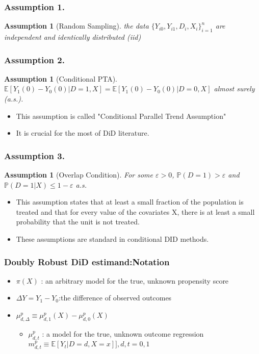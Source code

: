 \documentclass[fleqn]{beamer}
\newtheorem{assumption}[thm]{Assumption}
\begin{document}
\begin{frame}\frametitle{Assumption 1.}
    \begin{assumption}[Random Sampling]
        the data $\{Y_{i0}, Y_{i1}, D_{i}, X_{i}\}^{n}_{i = 1}$ are independent and identically distributed (iid)
    \end{assumption}
\end{frame}

\begin{frame}\frametitle{Assumption 2.}
    \begin{assumption}[Conditional PTA]
        $\mathbb{E}[Y_{1}(0) - Y_{0}(0)| D = 1, X] = \mathbb{E}[Y_{1}(0) - Y_{0}(0)|D = 0, X]$ almost surely (a.s.).
    \end{assumption}
    \begin{itemize}
        \item This assumption is called "Conditional Parallel Trend Assumption"
        \item It is crucial for the most of DiD literature.
    \end{itemize}
\end{frame}

\begin{frame}\frametitle{Assumption 3.}
    \begin{assumption}[Overlap Condition]
        For some $\varepsilon > 0$, $\mathbb{P}(D = 1) > \varepsilon$ and $\mathbb{P}(D = 1|X) \leq 1 - \varepsilon$ a.s.
    \end{assumption}
    \begin{itemize}
        \item This assumption states that at least a small fraction of the population is treated and that for every value of the covariates X, there is at least a small probability that the unit is not treated.%
        \item These assumptions are standard in conditional DID methods.
    \end{itemize}
\end{frame}

\begin{frame}\frametitle{Doubly Robust DiD estimand:Notation}
    \begin{itemize}
        \item $\pi(X)$ : an arbitrary model for the true, unknown propensity score
        \item $\Delta Y = Y_{1} - Y_{0}$:the difference of observed outcomes
        \item $\mu ^{p}_{d,\Delta} \equiv \mu ^{p}_{d,1}(X) - \mu ^{p}_{d,0}(X)$
        \begin{itemize}
            \item $\mu ^{p}_{d,t}$ : a model for the true, unknown outcome regression $m^{p}_{d,t} \equiv \mathbb{E}[Y_{t}|D = d, X = x]],d,t = 0,1$
        \end{itemize}
    \end{itemize}
\end{frame}
\end{document}
